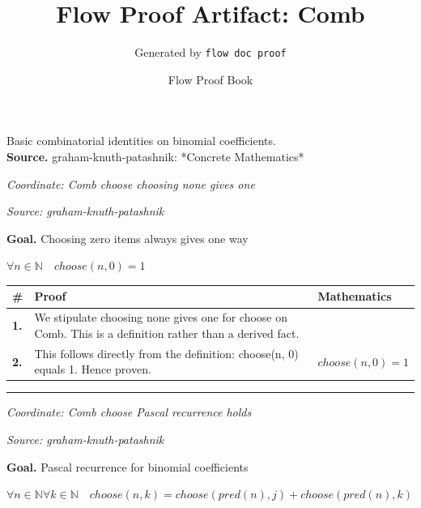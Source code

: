 \documentclass[11pt]{article}
\title{Flow Proof Artifact: Comb}
\author{Generated by \texttt{flow doc proof}}
\date{Flow Proof Book}
\theoremstyle{definition}
\begin{document}
\maketitle
Basic combinatorial identities on binomial coefficients.\\[0.5em]
\textbf{Source.} graham-knuth-patashnik: *Concrete Mathematics*\\[0.5em]
\bigskip
{}\par
\smallskip\noindent\textit{Coordinate: Comb \cdot choose \cdot choosing none gives one}\par
\smallskip\noindent\textit{Source: graham-knuth-patashnik}\par
\medskip
\noindent\textbf{Goal.} Choosing zero items always gives one way\par
\noindent$\displaystyle \forall n \in \mathbb{N}\quad choose(n, 0) = 1$\par
\medskip
\noindent
\begin{tabular}{@{} >{\raggedright\arraybackslash}p{} >{\raggedright\arraybackslash}p{} >{\raggedleft\arraybackslash}p{} @{}}
\textbf{\#} & \textbf{Proof} & \textbf{Mathematics} \\
\midrule
\textbf{1.} & We stipulate choosing none gives one for choose on Comb. This is a definition rather than a derived fact. & \\[0.45em]
\textbf{2.} & This follows directly from the definition: choose(n, 0) equals 1. Hence proven. & $\displaystyle choose(n, 0) = 1$ \\[0.45em]
\bottomrule
\end{tabular}
\label{thm:Comb-choose-choosing_none_gives_one}
\par\medskip\hrule
\bigskip
{}\par
\smallskip\noindent\textit{Coordinate: Comb \cdot choose \cdot Pascal recurrence holds}\par
\smallskip\noindent\textit{Source: graham-knuth-patashnik}\par
\medskip
\noindent\textbf{Goal.} Pascal recurrence for binomial coefficients\par
\noindent$\displaystyle \forall n \in \mathbb{N} \forall k \in \mathbb{N}\quad choose(n, k) = choose(pred(n), j) + choose(pred(n), k)$\par
\end{document}
